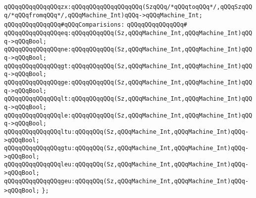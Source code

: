 \verb|qQQqqQQqqQQqqQQqzx:qQQqqQQqqQQqqQQqqQQq(SzqQQq/*qQQqtoqQQq*/,qQQqSzqQQq/*qQQqfromqQQq*/,qQQqMachine_Int)qQQq->qQQqMachine_Int;|\newline
\newline
\verb|qQQqqQQqqQQqqQQq#qQQqComparisions:|\newline
\verb|qQQqqQQqqQQqqQQq#|\newline
\verb|qQQqqQQqqQQqqQQqeq:qQQqqQQqqQQq(Sz,qQQqMachine_Int,qQQqMachine_Int)qQQq->qQQqBool;|\newline
\verb|qQQqqQQqqQQqqQQqne:qQQqqQQqqQQq(Sz,qQQqMachine_Int,qQQqMachine_Int)qQQq->qQQqBool;|\newline
\verb|qQQqqQQqqQQqqQQqgt:qQQqqQQqqQQq(Sz,qQQqMachine_Int,qQQqMachine_Int)qQQq->qQQqBool;|\newline
\verb|qQQqqQQqqQQqqQQqge:qQQqqQQqqQQq(Sz,qQQqMachine_Int,qQQqMachine_Int)qQQq->qQQqBool;|\newline
\verb|qQQqqQQqqQQqqQQqlt:qQQqqQQqqQQq(Sz,qQQqMachine_Int,qQQqMachine_Int)qQQq->qQQqBool;|\newline
\verb|qQQqqQQqqQQqqQQqle:qQQqqQQqqQQq(Sz,qQQqMachine_Int,qQQqMachine_Int)qQQq->qQQqBool;|\newline
\verb|qQQqqQQqqQQqqQQqltu:qQQqqQQq(Sz,qQQqMachine_Int,qQQqMachine_Int)qQQq->qQQqBool;|\newline
\verb|qQQqqQQqqQQqqQQqgtu:qQQqqQQq(Sz,qQQqMachine_Int,qQQqMachine_Int)qQQq->qQQqBool;|\newline
\verb|qQQqqQQqqQQqqQQqleu:qQQqqQQq(Sz,qQQqMachine_Int,qQQqMachine_Int)qQQq->qQQqBool;|\newline
\verb|qQQqqQQqqQQqqQQqgeu:qQQqqQQq(Sz,qQQqMachine_Int,qQQqMachine_Int)qQQq->qQQqBool;|\newline
\verb|};|\newline

